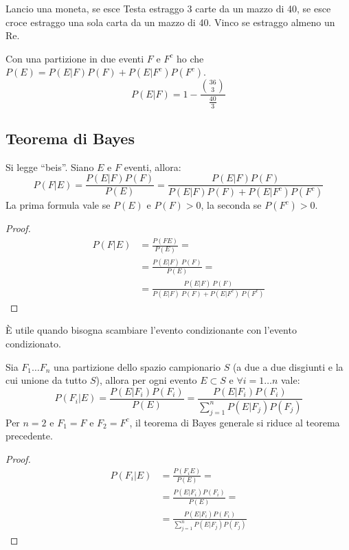 \begin{exmp}
Lancio una moneta, se esce Testa estraggo 3 carte da un mazzo di 40, se esce croce estraggo una sola carta da un mazzo di 40. Vinco se estraggo almeno un Re.

Con una partizione in due eventi $F$ e $F^c$ ho che $P(E) = P(E|F) P(F) + P(E|F^c) P(F^c)$.
\[
P(E|F) = 1 - \frac{\binom{36}{3}}{\frac{40}{3}}
\]
\end{exmp}

\subsection{Teorema di Bayes}

\begin{theorem}
Si legge ``beis''. Siano $E$ e $F$ eventi, allora:
\[
P(F|E) = \frac{P(E|F)P(F)}{P(E)} = \frac{P(E|F)P(F)}{P(E|F)P(F) + P(E|F^{c})P(F^{c})}
\]
La prima formula vale se $P(E)$ e $P(F) > 0$, la seconda se $P(F^{c}) > 0$.
\end{theorem}

\begin{proof}
\begin{align*}
P(F|E) &= \frac{P(FE)}{P(E)} = \tag{per definizione} \\
&= \frac{P(E|F) \ P(F)}{P(E)} = \tag{per la legge del prodotto} \\
&= \frac{P(E|F) \ P(F)}{P(E|F) \ P(F) + P(E|F^{c}) \ P(F^{c})} \tag{per la legge delle probabilit\`a totali}
\end{align*}
\end{proof}
\`E utile quando bisogna scambiare l'evento condizionante con l'evento condizionato.

\begin{theorem}
Sia $F_1 \dots F_n$ una partizione dello spazio campionario $S$ (a due a due disgiunti e la cui unione da tutto $S$), allora per ogni evento $E \subset S$ e $\forall i = 1 \dots n$ vale:
\[
P(F_i|E) = \frac{P(E|F_i)P(F_i)}{P(E)} = \frac{P(E|F_i) P(F_i)}{\sum_{j = 1}^{n} P(E|F_j)P(F_j)}
\]
Per $n = 2$ e $F_1 = F$ e $F_2 = F^{c}$, il teorema di Bayes generale si riduce al teorema precedente.
\end{theorem}

\begin{proof}
\begin{align*}
P(F_i|E ) &= \frac{P(F_i E)}{P(E)} = \tag*{per definizione} \\ 
&= \frac{P(E | F_i) P(F_i)}{P(E)} = \tag*{per la regola del prodotto} \\ 
&= \frac{P(E | F_i) P(F_i)}{\sum_{j = 1}^{n} P(E | F_j) P(F_j)} \tag*{per la legge della probabilit\`a totale}
\end{align*}
\end{proof}

